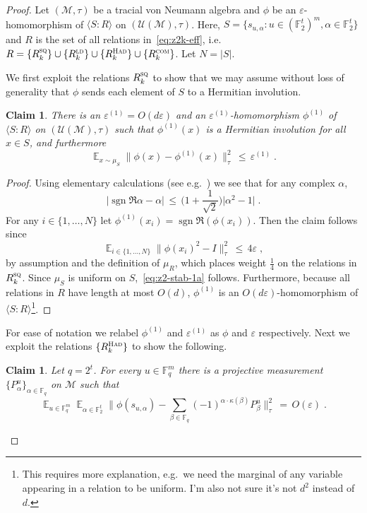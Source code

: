 \documentclass[11pt]{article}
\newtheorem{claim}[theorem]{Claim}
\theoremstyle{definition}
\newcommand{\Id}{\ensuremath{I}}
\DeclareMathOperator*{\Expectation}{\mathbb{E}}
\newcommand{\Es}[1]{\Expectation_{#1}}
\newcommand{\F}{\ensuremath{\mathbb{F}}}
\newcommand{\ld}{\textsc{ld}}
\newcommand{\com}{\textsc{com}}
\newcommand{\sq}{\textsc{sq}}
\newcommand{\mM}{\ensuremath{\mathcal{M}}}
\newcommand{\mU}{\ensuremath{\mathcal{U}}}
\newcommand{\had}{\textsc{Had}}
\newcommand{\eps}{\varepsilon}
\DeclareMathOperator{\sgn}{sgn}
\begin{document}
\begin{proof}
Let $(\mM,\tau)$ be a tracial von Neumann algebra and $\phi$ be an $\eps$-homomorphism of $\langle S:R\rangle$ on $(\mU(\mM),\tau)$. 
 Here, $S = \{s_{u,\alpha}: u\in (\F_2^t)^m, \alpha\in \F_2^t\}$ and $R$ is the set of all relations in~\eqref{eq:z2k-eff}, i.e.\ $R= \{R_k^\sq\}\cup \{R^\ld_k\}\cup\{R^\had_k\}\cup\{R^\com_k\}$. Let $N=|S|$.

We first exploit the relations $R_k^\sq$ to show that we may assume without loss of generality that $\phi$ sends each element of $S$ to a Hermitian involution. 

\begin{claim}\label{claim:z2-stab-1}
There is an $\eps^{(1)}=O(d\eps)$ and an $\eps^{(1)}$-homomorphism $\phi^{(1)}$ of $\langle S:R\rangle$ on $(\mU(\mM),\tau)$ such that $\phi^{(1)}(x)$ is a Hermitian involution for all $x\in S$, and furthermore
\begin{equation}\label{eq:z2-stab-1a}
 \Es{x\sim\mu_S} \big\| \phi(x) - \phi^{(1)}(x) \big\|_\tau^2 \,\leq\, \eps^{(1)}\;.
\end{equation}
\end{claim}

\begin{proof}
Using elementary calculations (see e.g.~\cite[Lemma 3.6]{slofstra2019set}) we see that for any complex $\alpha$, 
\[ \big| \sgn\Re\alpha-\alpha\big| \,\leq\, \Big(1+\frac{1}{\sqrt{2}}\Big) \big|\alpha^2 -1 \big|\;.\]
For any $i\in \{1,\ldots,N\}$ let $\phi^{(1)}(x_i) = \sgn\Re (\phi(x_i))$. Then the claim follows since 
\[ \Es{i\in\{1,\ldots,N\}} \big\| \phi(x_i)^2-\Id \big\|_\tau^2 \,\leq\, 4\eps\;,\]
by assumption and the definition of $\mu_R$, which places weight $\frac{1}{4}$ on the relations in $R_k^\sq$. Since $\mu_S$ is uniform on $S$,~\eqref{eq:z2-stab-1a} follows. Furthermore, because all relations in $R$ have length at most $O(d)$, $\phi^{(1)}$ is an $O(d\eps)$-homomorphism of $\langle S:R\rangle$\footnote{This requires more explanation, e.g.\ we need the marginal of any variable appearing in a relation to be uniform. I'm also not sure it's not $d^2$ instead of $d$.}. 
\end{proof}

For ease of notation we relabel $\phi^{(1)}$ and $\eps^{(1)}$ as $\phi$ and $\eps$ respectively. Next we exploit the relations $\{R^\had_k\}$ to show the following. 

\begin{claim}\label{claim:z2-stab-2}
Let $q=2^t$. 
For every $u\in \F_q^m$ there is a projective measurement $\{P^u_\alpha\}_{\alpha\in \F_{q}}$ on $\mM$ such that 
\begin{equation}\label{eq:z2-stab-2}
 \Es{u\in \F_q^m} \Es{\alpha\in \F_2^t} \Big\| \phi(s_{u,\alpha}) - \sum_{\beta\in\F_q} (-1)^{\alpha \cdot \kappa(\beta)} P^u_\beta \Big\|_\tau^2 \,=\, O(\eps)\;. 
\end{equation}
\end{claim}


\end{proof}
\end{document}
